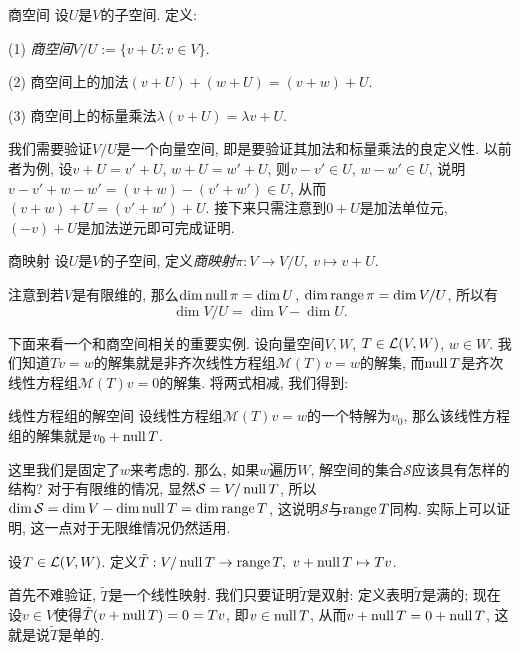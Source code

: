 \begin{definition}{商空间}
	设$U$是$V$的子空间. 定义: 
	
	(1) \textit{商空间}$V/U:=\{ v+U:v \in V \}$. 
	
	(2) 商空间上的加法$(v+U)+(w+U) = (v+w)+U$.
	
	(3) 商空间上的标量乘法$\lambda (v+U) = \lambda v+U$. 
\end{definition}

我们需要验证$V/U$是一个向量空间, 即是要验证其加法和标量乘法的良定义性. 以前者为例, 设$v+U=v'+U$, $w+U=w'+U$, 则$v-v' \in U$, $w-w' \in U$, 说明$v-v'+w-w' = (v+w) - (v'+w') \in U$, 从而$(v+w) + U = (v'+w') + U$. 接下来只需注意到$0+U$是加法单位元, $(-v)+U$是加法逆元即可完成证明. 

\begin{definition}{商映射}
	设$U$是$V$的子空间, 定义\textit{商映射}$\pi : V \to V/U,~v \mapsto v+U$. 
\end{definition}

注意到若$V$是有限维的, 那么$\dim \operatorname{null} \pi = \dim U$, $\dim \operatorname{range} \pi = \dim V/U$, 所以有$$\dim V/U = \dim V - \dim U. $$

下面来看一个和商空间相关的重要实例. 设向量空间$V,W$, $T \in \mathcal{L} (V,W)$, $w \in W$. 我们知道$Tv=w$的解集就是非齐次线性方程组$\mathcal{M}(T) v = w$的解集, 而$\operatorname{null} T$是齐次线性方程组$\mathcal{M}(T) v = 0$的解集. 将两式相减, 我们得到: 

\begin{proposition}{线性方程组的解空间}
	设线性方程组$\mathcal{M}(T)v=w$的一个特解为$v_0$, 那么该线性方程组的解集就是$v_0+\operatorname{null} T$. 
\end{proposition}

这里我们是固定了$w$来考虑的. 那么, 如果$w$遍历$W$, 解空间的集合$\mathcal{S}$应该具有怎样的结构? 对于有限维的情况, 显然$\mathcal{S}=V/\operatorname{null} T$, 所以$\dim \mathcal{S} = \dim V - \dim \operatorname{null} T = \dim \operatorname{range} T$, 这说明$\mathcal{S}$与$\operatorname{range} T$同构. 实际上可以证明, 这一点对于无限维情况仍然适用. 

\begin{definition}{}
	设$T \in \mathcal{L} (V,W)$. 定义$\tilde{T}:V/\operatorname{null} T \to \operatorname{range} T,~v+\operatorname{null} T \mapsto Tv$. 
\end{definition}

首先不难验证, $\tilde{T}$是一个线性映射. 我们只要证明$\tilde{T}$是双射: 定义表明$\tilde{T}$是满的; 现在设$v \in V$使得$\tilde{T}(v+\operatorname{null} T)=0=Tv$, 即$v \in \operatorname{null} T$, 从而$v+\operatorname{null} T = 0 +\operatorname{null} T$, 这就是说$\tilde{T}$是单的. 



